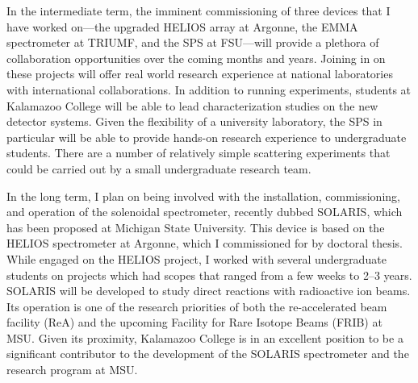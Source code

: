 {In the intermediate term, the imminent commissioning of three devices that I have worked on---the upgraded HELIOS array at Argonne, the EMMA spectrometer at TRIUMF, and the SPS at FSU---will provide a plethora of collaboration opportunities over the coming months and years.
Joining in on these projects will offer real world research experience at national laboratories with international collaborations.
In addition to running experiments, students at Kalamazoo College will be able to lead characterization studies on the new detector systems.
Given the flexibility of a university laboratory, the SPS in particular will be able to provide hands-on research experience to undergraduate students. There are a number of relatively simple scattering experiments that could be carried out by a small undergraduate research team.

In the long term, I plan on being involved with the installation, commissioning, and operation of the solenoidal spectrometer, recently dubbed 
SOLARIS, which has been proposed at Michigan State University. This device is based on the HELIOS spectrometer at Argonne, which I commissioned for by doctoral thesis. While engaged on the HELIOS project, I worked with several undergraduate students on projects which had scopes that ranged from a few weeks to 2--3 years. 
 SOLARIS will be developed to study direct reactions with radioactive ion beams. Its operation is one of the research priorities 
of both the re-accelerated beam facility (ReA) and the upcoming Facility for Rare Isotope Beams (FRIB) at MSU.
Given its proximity, Kalamazoo College is in an excellent position to be a significant contributor to the development of the SOLARIS spectrometer and the research program at MSU. 
}
